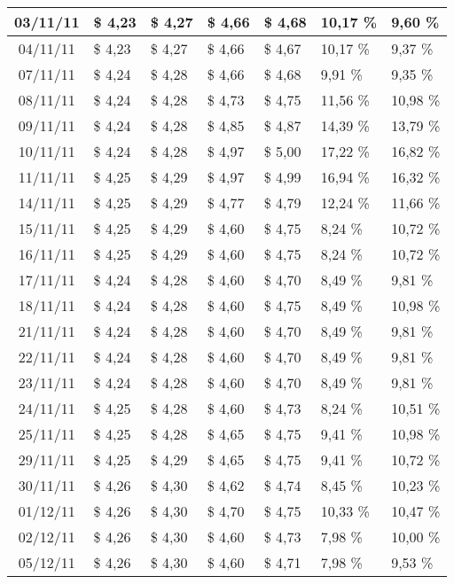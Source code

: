 \begin{center}
\begin{longtable}{|c|p{1.5cm}|p{1.5cm}|p{1.5cm}|p{1.5cm}|p{1.5cm}|p{1.5cm}|}
03/11/11 & \$ 4,23 & \$ 4,27 & \$ 4,66 & \$ 4,68 & 10,17 \% & 9,60 \% \\ \hline
04/11/11 & \$ 4,23 & \$ 4,27 & \$ 4,66 & \$ 4,67 & 10,17 \% & 9,37 \% \\ \hline
07/11/11 & \$ 4,24 & \$ 4,28 & \$ 4,66 & \$ 4,68 & 9,91 \% & 9,35 \% \\ \hline
08/11/11 & \$ 4,24 & \$ 4,28 & \$ 4,73 & \$ 4,75 & 11,56 \% & 10,98 \% \\ \hline
09/11/11 & \$ 4,24 & \$ 4,28 & \$ 4,85 & \$ 4,87 & 14,39 \% & 13,79 \% \\ \hline
10/11/11 & \$ 4,24 & \$ 4,28 & \$ 4,97 & \$ 5,00 & 17,22 \% & 16,82 \% \\ \hline
11/11/11 & \$ 4,25 & \$ 4,29 & \$ 4,97 & \$ 4,99 & 16,94 \% & 16,32 \% \\ \hline
14/11/11 & \$ 4,25 & \$ 4,29 & \$ 4,77 & \$ 4,79 & 12,24 \% & 11,66 \% \\ \hline
15/11/11 & \$ 4,25 & \$ 4,29 & \$ 4,60 & \$ 4,75 & 8,24 \% & 10,72 \% \\ \hline
16/11/11 & \$ 4,25 & \$ 4,29 & \$ 4,60 & \$ 4,75 & 8,24 \% & 10,72 \% \\ \hline
17/11/11 & \$ 4,24 & \$ 4,28 & \$ 4,60 & \$ 4,70 & 8,49 \% & 9,81 \% \\ \hline
18/11/11 & \$ 4,24 & \$ 4,28 & \$ 4,60 & \$ 4,75 & 8,49 \% & 10,98 \% \\ \hline
21/11/11 & \$ 4,24 & \$ 4,28 & \$ 4,60 & \$ 4,70 & 8,49 \% & 9,81 \% \\ \hline
22/11/11 & \$ 4,24 & \$ 4,28 & \$ 4,60 & \$ 4,70 & 8,49 \% & 9,81 \% \\ \hline
23/11/11 & \$ 4,24 & \$ 4,28 & \$ 4,60 & \$ 4,70 & 8,49 \% & 9,81 \% \\ \hline
24/11/11 & \$ 4,25 & \$ 4,28 & \$ 4,60 & \$ 4,73 & 8,24 \% & 10,51 \% \\ \hline
25/11/11 & \$ 4,25 & \$ 4,28 & \$ 4,65 & \$ 4,75 & 9,41 \% & 10,98 \% \\ \hline
29/11/11 & \$ 4,25 & \$ 4,29 & \$ 4,65 & \$ 4,75 & 9,41 \% & 10,72 \% \\ \hline
30/11/11 & \$ 4,26 & \$ 4,30 & \$ 4,62 & \$ 4,74 & 8,45 \% & 10,23 \% \\ \hline
01/12/11 & \$ 4,26 & \$ 4,30 & \$ 4,70 & \$ 4,75 & 10,33 \% & 10,47 \% \\ \hline
02/12/11 & \$ 4,26 & \$ 4,30 & \$ 4,60 & \$ 4,73 & 7,98 \% & 10,00 \% \\ \hline
05/12/11 & \$ 4,26 & \$ 4,30 & \$ 4,60 & \$ 4,71 & 7,98 \% & 9,53 \% \\ \hline

\end{longtable}
\end{center}
